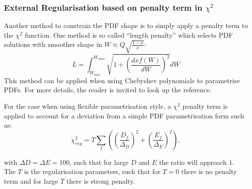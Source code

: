 \subsubsection{External Regularisation based on penalty term in $\chi^2$}

Another method to constrain the PDF shape is to simply apply a penalty term
to the $\chi^2$ function. 
One method is so called ``length penalty'' which selects PDF solutions with smoother shape in $W\approx Q\sqrt{\frac{1-x}{x}}$:
\begin{equation}
L=\int_{W_{min}}^{W_{max}} \sqrt{1+\left(\frac{dxf(W)}{dW}\right)^2}dW
\end{equation}
This method can be applied when using Chebyshev polynomials to parametrise PDFs.
For more details, the reader is invited to look up the \cite{Chebyshev} reference.

For the case when using flexible parametrisation style, 
a $\chi^2$ penalty term is applied to account for a deviation 
from a simple PDF parametrisation form such as:
\begin{equation}
\chi^2_{reg}= T\sum_f\left(\left(\frac{D_f}{\Delta_D}\right)^2+ \left(\frac{E_f}{\Delta_E}\right)^2\right),
\end{equation}

with $\Delta D=\Delta E = 100$, such that for large $D$ and $E$ the ratio will approach $1$. The $T$ is the regularisation parameters, such that for $T=0$ there is no penalty term and for large $T$ there is strong penalty.
